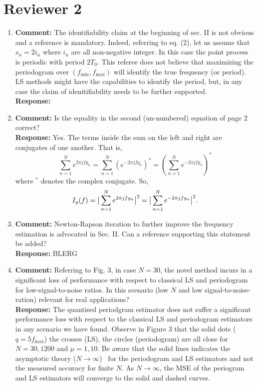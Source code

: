 \documentclass[a4paper,10pt]{article}
\begin{document}
\section*{Reviewer 2}


\begin{enumerate}

\item\textbf{Comment:}
 The identifiability claim at the beginning of sec. II is not obvious and a reference is mandatory. Indeed, referring to eq. (2), let us assume that $s_n = 2 i_n$ where $i_n$ are all non-negative integer. In this case the point process is periodic with period $2 T_0$. This referee does not believe that maximizing the periodogram over $(f_{\text{min}},f_{\text{max}})$ will identify the true frequency (or period). LS methods might have the capabilities to identify the period, but, in any case the claim of idenitifiability needs to be further supported.
\\
\textbf{Response:}


\item\textbf{Comment:}
Is the equality in the second (un-numbered) equation of page 2 correct?
\\
\textbf{Response:}
Yes.  The terms inside the sum on the left and right are conjugates of one another.  That is,
\[
\sum_{n=1}^N e^{ 2\pi j f y_n} = \sum_{n=1}^N (e^{-2\pi j f y_n})^* = \left( \sum_{n=1}^N e^{ -2\pi j f y_n} \right)^*
\]
where $^*$ denotes the complex conjugate.  So,
\[
I_y(f) = \big\vert  \sum_{n=1}^N e^{ 2\pi j f y_n}  \big\vert^2 = \big\vert  \sum_{n=1}^N e^{ -2\pi j f y_n}  \big\vert^2.
\]

\item\textbf{Comment:}
Newton-Rapson iteration to further improve the frequency estimation is advocated in Sec. II. Can a reference supporting this statement be added?
\\
\textbf{Response:}
BLERG

\item\textbf{Comment:}
Referring to Fig. 3, in case $N=30$, the novel method incurs in a significant loss of performance with respect to classical LS and periodogram for low-signal-to-noise ratios. In this scenario (low $N$ and low signal-to-noise-ration) relevant for real applications?
\\
\textbf{Response:}
The quantised periodgram estimator does not suffer a significant performance loss with respect to the classical LS and periodogram estimators in any scenario we have found.  Observe in Figure 3 that the solid dots ($q=5 f_{\text{max}}$) the crosses (LS), the circles (periodogram) are all close for $N=30,1200$ and $\mu=1,10$.  Be aware that the solid lines indicates the asymptotic theory ($N\to\infty$)~\cite{Quinn_sparse_noisy_SSP_2012,Quinn20013asilomar_period_est} for the periodogram and LS estimators and not the measured accuracy for finite $N$.  As $N\to\infty$, the MSE of the periogram and LS estimators will converge to the solid and dashed curves.

\end{enumerate}



{\small

}
\end{document}
